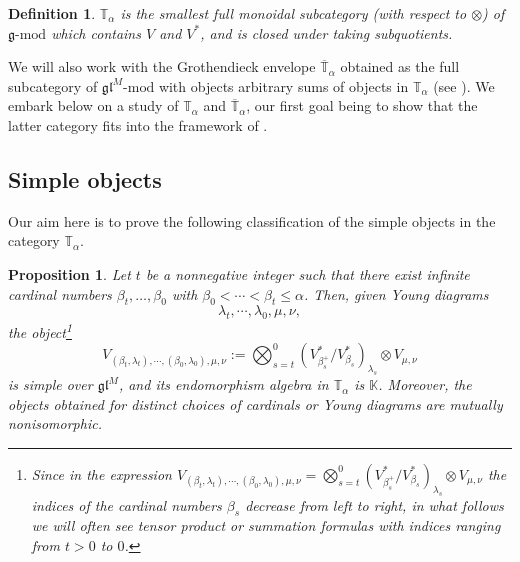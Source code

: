 \documentclass[11pt]{article}
\theoremstyle{plain}
\newtheorem{proposition}[lemma]{Proposition}
\theoremstyle{nonumberplain}
\theoremstyle{plain}
\newtheorem{definition}[lemma]{Definition}
\theoremstyle{nonumberplain}
\newcommand\bK{\mathbb K}
\newcommand\bT{\mathbb T}
\newcommand\fg{\mathfrak{g}}
\newcommand\fgl{\mathfrak{gl}}
\begin{document}
\begin{definition}\label{def.t}
$\bT_\alpha$ is the smallest
full monoidal {subcategory (with respect to $\otimes$) of ${\fg\text{-mod}}$} which contains $V$ and
$V^*$, and is closed under taking subquotients.
\label{def.bTcat}
\end{definition}

We will also work with the Grothendieck envelope
$\overline{\bT}_\alpha$ obtained as the full subcategory of
${\fgl^M\text{-mod}}$ {with objects arbitrary sums} of objects in
$\bT_\alpha$ (see ). We embark below on a study of
$\bT_\alpha$ and $\overline{\bT}_\alpha$, our first goal being to
show that the latter category fits into the framework of
.










\subsection{Simple objects}\label{subse.simple}




Our aim here is to prove the following classification of the simple
objects in the category $\bT_\alpha$.


\begin{proposition}\label{pr.simples}
  Let $t$ be a nonnegative integer such that there exist infinite
  cardinal numbers $\beta_t,\ldots,\beta_0$ with
  $\beta_0<\cdots<\beta_t\leq \alpha$. Then, given Young diagrams
  \begin{equation*}
    \lambda_t,\cdots,\lambda_0, \mu,\nu,
  \end{equation*}
the object\footnote{Since in the expression $V_{(\beta_t,\lambda_t),\cdots,(\beta_0,\lambda_0),\mu,\nu}=
   \bigotimes_{s=t}^0 (V^*_{\beta_s^+}/V^*_{\beta_s})_{\lambda_s}\otimes V_{\mu,\nu}$ the indices of the cardinal numbers $\beta_s$ decrease from left to right, in what follows we will often see tensor product or summation formulas with indices ranging from $t>0$ to $0$.}
\begin{equation}\label{eq:tensor}
   { V_{(\beta_t,\lambda_t),\cdots,(\beta_0,\lambda_0),\mu,\nu}:=}
   \bigotimes_{s=t}^0 (V^*_{\beta_s^+}/V^*_{\beta_s})_{\lambda_s}\otimes V_{\mu,\nu}
\end{equation}
is simple over $\fgl^M${, and its endomorphism algebra in $\bT_\alpha$
  is $\bK$.  Moreover,} the objects obtained for distinct choices of
cardinals or Young diagrams are mutually nonisomorphic.
\end{proposition}
\end{document}
